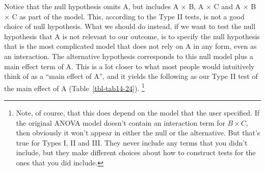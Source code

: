 \documentclass[
  a4paper,
]{book}
\begin{document}
Notice that the null hypothesis omits A, but includes A \(\times\) B, A
\(\times\) C and A \(\times\) B \(\times\) C as part of the model. This,
according to the Type II tests, is not a good choice of null hypothesis.
What we should do instead, if we want to test the null hypothesis that A
is not relevant to our outcome, is to specify the null hypothesis that
is the most complicated model that does not rely on A in any form, even
as an interaction. The alternative hypothesis corresponds to this null
model plus a main effect term of A. This is a lot closer to what most
people would intuitively think of as a ``main effect of A'', and it
yields the following as our Type II test of the main effect of A
(Table~\ref{tbl-tab14-24}). \footnote{Note, of course, that this does
  depend on the model that the user specified. If the original ANOVA
  model doesn't contain an interaction term for \(B \times C\), then
  obviously it won't appear in either the null or the alternative. But
  that's true for Types I, II and III. They never include any terms that
  you didn't include, but they make different choices about how to
  construct tests for the ones that you did include.}

\hypertarget{tbl-tab14-24}{}
 
  \providecommand{\huxb}[2]{\arrayrulecolor[RGB]{#1}\global\arrayrulewidth=#2pt}
  \providecommand{\huxvb}[2]{\color[RGB]{#1}\vrule width #2pt}
  \providecommand{\huxtpad}[1]{\rule{0pt}{#1}}
  \providecommand{\huxbpad}[1]{\rule[-#1]{0pt}{#1}}
\end{document}
